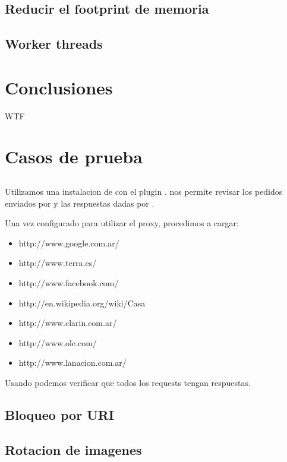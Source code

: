 \documentclass[11pt,a4paper,titlepage]{article}
\begin{document}
    \subsection{Reducir el footprint de memoria}

    \subsection{Worker threads}

\section{Conclusiones}
    WTF

\section{Casos de prueba}
    \subsection{}
    Utilizamos una instalacion de  con el plugin .
     nos permite revisar los pedidos enviados por  y las respuestas dadas por \duta.

    Una vez configurado  para utilizar el proxy, procedimos a cargar:
    \begin{itemize}
        \item http://www.google.com.ar/
        \item http://www.terra.es/
        \item http://www.facebook.com/
        \item http://en.wikipedia.org/wiki/Casa
        \item http://www.clarin.com.ar/
        \item http://www.ole.com/
        \item http://www.lanacion.com.ar/
    \end{itemize}

    Usando  podemos verificar que todos los requests tengan respuestas.

    \subsection{Bloqueo por URI}

    \subsection{Rotacion de imagenes}
\end{document}
